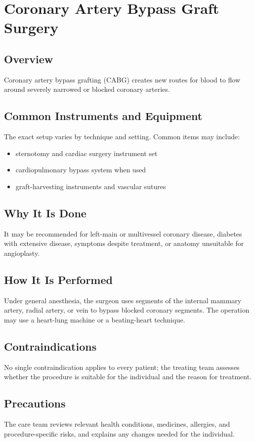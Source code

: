 \chapter{Coronary Artery Bypass Graft Surgery}

\section*{Overview}
Coronary artery bypass grafting (CABG) creates new routes for blood to flow around severely narrowed or blocked coronary arteries.

\section*{Common Instruments and Equipment}
The exact setup varies by technique and setting. Common items may include:
\begin{itemize}[nosep,leftmargin=*]
  \item sternotomy and cardiac surgery instrument set
  \item cardiopulmonary bypass system when used
  \item graft-harvesting instruments and vascular sutures
\end{itemize}

\section*{Why It Is Done}
It may be recommended for left-main or multivessel coronary disease, diabetes with extensive disease, symptoms despite treatment, or anatomy unsuitable for angioplasty.

\section*{How It Is Performed}
Under general anesthesia, the surgeon uses segments of the internal mammary artery, radial artery, or vein to bypass blocked coronary segments. The operation may use a heart-lung machine or a beating-heart technique.

\section*{Contraindications}
No single contraindication applies to every patient; the treating team assesses whether the procedure is suitable for the individual and the reason for treatment.

\section*{Precautions}
The care team reviews relevant health conditions, medicines, allergies, and procedure-specific risks, and explains any changes needed for the individual.

